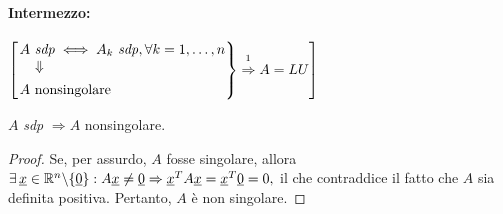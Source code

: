 \paragraph{Intermezzo:}{$\left[\begin{rcases}
    \Vrightarrow{A\text{ \textit{sdp}}}{}\iff A_k\text{ \textit{sdp}}, \forall k=1,\hdots,n\\
    A\text{ nonsingolare}
\end{rcases}\overset{\footnotemark}{\Rightarrow} A=LU\right]$}


\begin{theorem}\label{th:matrSDPNonSing}
    $A$ \textit{sdp} $\Rightarrow A$ nonsingolare.
\end{theorem}
\begin{proof}
    Se, per assurdo, $A$ fosse singolare, allora $\exists\, \uline x\in\mathbb R^n\backslash\{\uline 0\}: A\uline x\neq \uline 0 \Rightarrow \uline x^T A \uline x = \uline x^T\uline 0 = 0,$ il che contraddice il fatto che $A$ sia definita positiva. Pertanto, $A$ è non singolare.
\end{proof}

